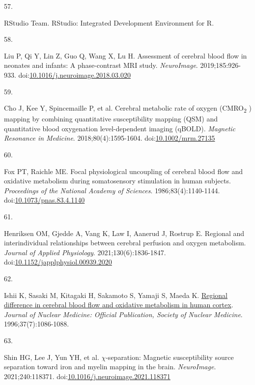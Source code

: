 \documentclass[
  letterpaper,
  DIV=11,
  numbers=noendperiod]{scrartcl}
\newlength{\cslhangindent}
\newlength{\csllabelwidth}
\newenvironment{CSLReferences}[2] %
 {\begin{list}{}{%
  \setlength{\itemindent}{0pt}
  \setlength{\leftmargin}{0pt}
  \setlength{\parsep}{0pt}
  \ifodd #1
   \setlength{\leftmargin}{\cslhangindent}
   \setlength{\itemindent}{-1\cslhangindent}
  \fi
  \setlength{\itemsep}{#2\baselineskip}}}
 {\end{list}}
\newcommand{\CSLLeftMargin}[1]{\parbox[t]{\csllabelwidth}{\strut#1\strut}}
\newcommand{\CSLRightInline}[1]{\parbox[t]{\linewidth - \csllabelwidth}{\strut#1\strut}}
\begin{document}
\begin{CSLReferences}{0}{1}
\CSLLeftMargin{57. }%
\CSLRightInline{RStudio Team. {RStudio}: {Integrated Development
Environment} for {R}.}

\CSLLeftMargin{58. }%
\CSLRightInline{Liu P, Qi Y, Lin Z, Guo Q, Wang X, Lu H. Assessment of
cerebral blood flow in neonates and infants: {A} phase-contrast {MRI}
study. \emph{NeuroImage}. 2019;185:926-933.
doi:\href{https://doi.org/10.1016/j.neuroimage.2018.03.020}{10.1016/j.neuroimage.2018.03.020}}

\CSLLeftMargin{59. }%
\CSLRightInline{Cho J, Kee Y, Spincemaille P, et al. Cerebral metabolic
rate of oxygen ({CMRO}{\textsubscript{2}} ) mapping by combining
quantitative susceptibility mapping ({QSM}) and quantitative blood
oxygenation level-dependent imaging ({qBOLD}). \emph{Magnetic Resonance
in Medicine}. 2018;80(4):1595-1604.
doi:\href{https://doi.org/10.1002/mrm.27135}{10.1002/mrm.27135}}

\CSLLeftMargin{60. }%
\CSLRightInline{Fox PT, Raichle ME. Focal physiological uncoupling of
cerebral blood flow and oxidative metabolism during somatosensory
stimulation in human subjects. \emph{Proceedings of the National Academy
of Sciences}. 1986;83(4):1140-1144.
doi:\href{https://doi.org/10.1073/pnas.83.4.1140}{10.1073/pnas.83.4.1140}}

\CSLLeftMargin{61. }%
\CSLRightInline{Henriksen OM, Gjedde A, Vang K, Law I, Aanerud J,
Rostrup E. Regional and interindividual relationships between cerebral
perfusion and oxygen metabolism. \emph{Journal of Applied Physiology}.
2021;130(6):1836-1847.
doi:\href{https://doi.org/10.1152/japplphysiol.00939.2020}{10.1152/japplphysiol.00939.2020}}

\CSLLeftMargin{62. }%
\CSLRightInline{Ishii K, Sasaki M, Kitagaki H, Sakamoto S, Yamaji S,
Maeda K. \href{https://www.ncbi.nlm.nih.gov/pubmed/8965174}{Regional
difference in cerebral blood flow and oxidative metabolism in human
cortex}. \emph{Journal of Nuclear Medicine: Official Publication,
Society of Nuclear Medicine}. 1996;37(7):1086-1088.}

\CSLLeftMargin{63. }%
\CSLRightInline{Shin HG, Lee J, Yun YH, et al. {\(\chi\)}-separation:
{Magnetic} susceptibility source separation toward iron and myelin
mapping in the brain. \emph{NeuroImage}. 2021;240:118371.
doi:\href{https://doi.org/10.1016/j.neuroimage.2021.118371}{10.1016/j.neuroimage.2021.118371}}


\end{CSLReferences}
\end{document}
